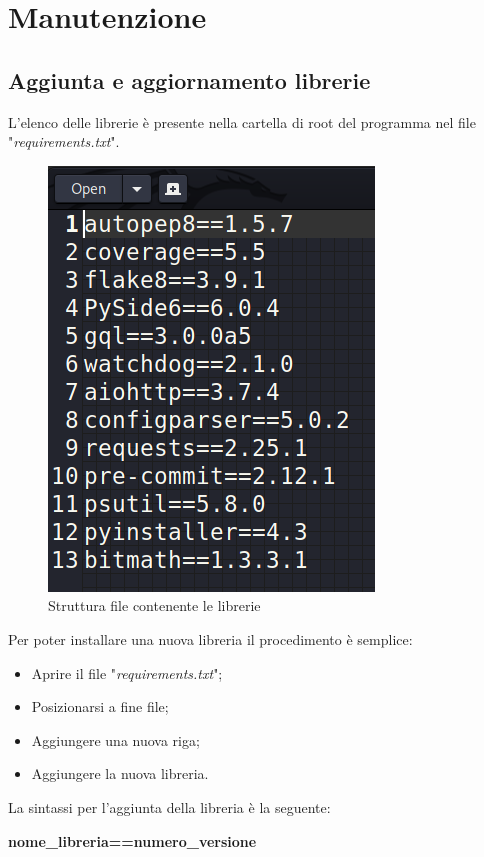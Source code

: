 \section{Manutenzione}

\subsection{Aggiunta e aggiornamento librerie}
L'elenco delle librerie è presente nella cartella di root del programma nel file "\textit{requirements.txt}".

\begin{figure}[H]
    \centering
    \includegraphics[scale = 0.5]{components/img/requirements.png}
    \caption{Struttura file contenente le librerie}
    \label{fig:Struttura file contentente le librerie}
\end{figure}
Per poter installare una nuova libreria il procedimento è semplice:
\begin{itemize}
	\item Aprire il file "\textit{requirements.txt}";
	\item Posizionarsi a fine file;
	\item Aggiungere una nuova riga;
	\item Aggiungere la nuova libreria.
\end{itemize}
La sintassi per l'aggiunta della libreria è la seguente:
\newline{} \centerline{\textbf{nome\_libreria==numero\_versione}}\newline{} 

\subsection{}